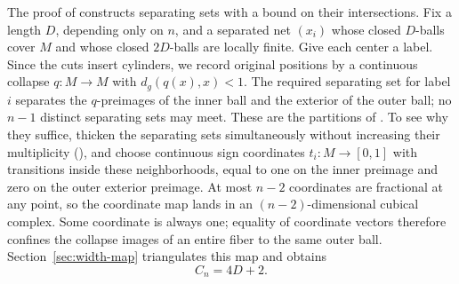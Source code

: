 The proof of  constructs separating sets with a bound
on their intersections. Fix a length \(D\), depending only on \(n\),
and a separated net \((x_i)\) whose closed \(D\)-balls cover \(M\)
and whose closed \(2D\)-balls are locally finite. Give each center a
label. Since the cuts insert cylinders, we record original positions
by a continuous collapse \(q:M\to M\) with \(d_g(q(x),x)<1\).
The required separating set for label \(i\) separates the \(q\)-preimages of
the inner ball and the exterior of the outer ball; no \(n-1\)
distinct separating sets may meet. These are the partitions of
. To see why they suffice, thicken the separating sets
simultaneously without increasing their multiplicity
(), and choose continuous sign coordinates
\(t_i:M\to[0,1]\) with transitions inside these neighborhoods,
equal to one on the inner preimage and zero on the outer exterior
preimage. At most \(n-2\) coordinates are
fractional at any point, so the coordinate map lands in an
\((n-2)\)-dimensional cubical complex. Some coordinate is always one;
equality of coordinate vectors therefore confines the collapse images
of an entire fiber to the same outer ball. Section~\ref{sec:width-map}
triangulates this map and obtains
\[
 C_n=4D+2.
\]

